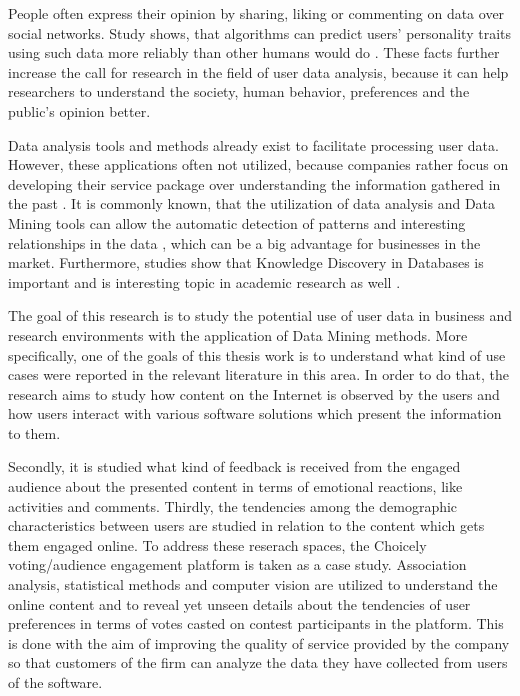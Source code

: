     People often express their opinion by sharing, liking or commenting on data over social networks. Study shows, that algorithms can predict users' personality traits using such data more reliably than other humans would do \cite{youyou2015computer}. These facts further increase the call for research in the field of user data analysis, because it can help researchers to understand the society, human behavior, preferences and the public's opinion better.

    Data analysis tools and methods already exist to facilitate processing user data. However, these applications often not utilized, because companies rather focus on developing their service package over understanding the information gathered in the past \cite{bigdatamanagementrevolution, inmon2007tapping}. It is commonly known, that the utilization of data analysis and Data Mining tools can allow the automatic detection of patterns and interesting relationships in the data \cite{introtodatamining, Friedman97datamining}, which can be a big advantage for businesses in the market. Furthermore, studies show that Knowledge Discovery in Databases is important and is interesting topic in academic research as well \cite{bigdatamanagementrevolution, zarsky2002mine}.
    
    The goal of this research is to study the potential use of user data in business and research environments with the application of Data Mining methods. More specifically, one of the goals of this thesis work is to understand what kind of use cases were reported in the relevant literature in this area. In order to do that, the research aims to study how content on the Internet is observed by the users and how users interact with various software solutions which present the information to them. 
    
    Secondly, it is studied what kind of feedback is received from the engaged audience about the presented content in terms of emotional reactions, like activities and comments. Thirdly, the tendencies among the demographic characteristics between users are studied in relation to the content which gets them engaged online. To address these reserach spaces, the Choicely voting/audience engagement platform is taken as a case study. Association analysis, statistical methods and computer vision are utilized to understand the online content and to reveal yet unseen details about the tendencies of user preferences in terms of votes casted on contest participants in the platform. This is done with the aim of improving the quality of service provided by the company so that customers of the firm can analyze the data they have collected from users of the software.
    
